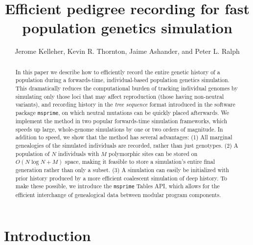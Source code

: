 \documentclass{article}
\newcommand{\msprime}{\texttt{msprime}}
\begin{document}
\title{Efficient pedigree recording for fast population genetics simulation}
\author{Jerome Kelleher,
        Kevin R. Thornton,
        Jaime Ashander, and
        Peter L. Ralph}
\maketitle



\begin{abstract}
    In this paper we describe how to
    efficiently record the entire genetic history of a population
    during a forwards-time, individual-based population genetics simulation.
    This dramatically reduces the computational burden of tracking individual genomes
    by simulating only those loci that may affect reproduction (those having non-neutral variants),
    and recording history in the \emph{tree sequence} format introduced in the software package \msprime,
    on which neutral mutations can be quickly placed afterwards.
    We implement the method in two popular forwards-time simulation frameworks,
    which speeds up large, whole-genome simulations by one or two orders of magnitude.
    In addition to speed, we show that the method has several advantages:
    (1) All marginal genealogies of the simulated individuals are recorded, rather than just genotypes.
    (2) A population of $N$ individuals with $M$ polymorphic sites
    can be stored on $O(N \log N + M)$ space, making it feasible to store a simulation's entire final generation
    rather than only a subset.
    (3) A simulation can easily be initialized with prior history produced by a more efficient coalescent simulation of deep history.
    To make these possible,
    we introduce the \msprime{} Tables API, which allows for the efficient interchange of genealogical data between modular program components.
\end{abstract}



\section*{Introduction}
\end{document}
